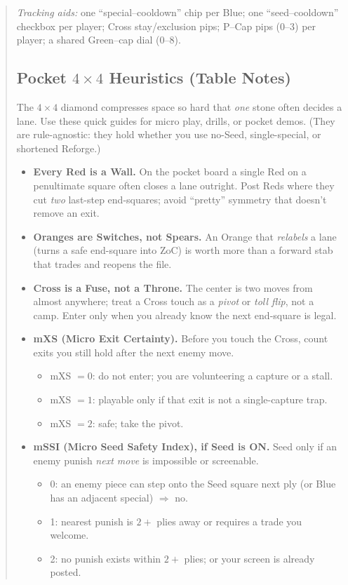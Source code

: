 \documentclass[11pt]{article}
\begin{document}
\begin{quote}
\medskip
\noindent\textit{Tracking aids:} one “special–cooldown” chip per Blue; one “seed–cooldown” checkbox per player; Cross stay/exclusion pips; P–Cap pips (0–3) per player; a shared Green–cap dial (0–8).

\subsection*{Pocket $4\times4$ Heuristics (Table Notes)}
\label{sec:pocket-4x4-heuristics}

\noindent The $4\times4$ diamond compresses space so hard that \emph{one} stone often decides a lane. Use these quick guides for micro play, drills, or pocket demos. (They are rule-agnostic: they hold whether you use no-Seed, single-special, or shortened Reforge.)

\medskip
\begin{itemize}[leftmargin=1.3em,itemsep=0.35em]

  \item \textbf{Every Red is a Wall.} On the pocket board a single Red on a penultimate square often closes a lane outright. Post Reds where they cut \emph{two} last-step end-squares; avoid “pretty” symmetry that doesn’t remove an exit.

  \item \textbf{Oranges are Switches, not Spears.} An Orange that \emph{relabels} a lane (turns a safe end-square into ZoC) is worth more than a forward stab that trades and reopens the file.

  \item \textbf{Cross is a Fuse, not a Throne.} The center is two moves from almost anywhere; treat a Cross touch as a \emph{pivot} or \emph{toll flip}, not a camp. Enter only when you already know the next end-square is legal.

  \item \textbf{mXS (Micro Exit Certainty).} Before you touch the Cross, count exits you still hold after the next enemy move.
  \begin{itemize}[itemsep=0.2em]
    \item mXS $=0$: do not enter; you are volunteering a capture or a stall.
    \item mXS $=1$: playable only if that exit is not a single-capture trap.
    \item mXS $=2$: safe; take the pivot.
  \end{itemize}

  \item \textbf{mSSI (Micro Seed Safety Index), if Seed is ON.} Seed only if an enemy punish \emph{next move} is impossible or screenable.
  \begin{itemize}[itemsep=0.2em]
    \item 0: an enemy piece can step onto the Seed square next ply (or Blue has an adjacent special) $\Rightarrow$ no.
    \item 1: nearest punish is $2+$ plies away or requires a trade you welcome.
    \item 2: no punish exists within $2+$ plies; or your screen is already posted.
  \end{itemize}


\end{itemize}
\end{quote}
\end{document}
